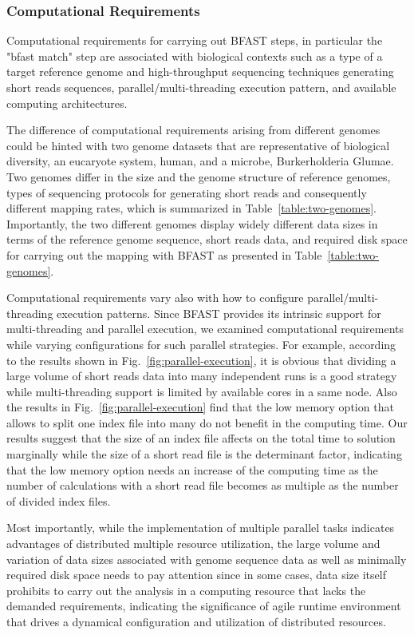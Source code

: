 \documentclass[12pt]{article}
\begin{document}
\subsubsection{Computational Requirements}

Computational requirements for carrying out BFAST steps, in particular the "bfast match" step are associated with biological contexts such as a type of a target reference genome and high-throughput sequencing techniques generating short reads sequences, parallel/multi-threading execution pattern, and available computing architectures.  

The difference of computational requirements arising from different genomes could be hinted with two genome datasets that are representative of biological diversity, an eucaryote system, human, and a microbe, Burkerholderia Glumae\cite{kim2011}.  Two genomes differ in the size and the genome structure of reference genomes, types of sequencing protocols for generating short reads and consequently different mapping rates, which is summarized in Table~\ref{table:two-genomes}.  Importantly, the two different genomes display widely different data sizes in terms of the reference genome sequence, short reads data, and required disk space for carrying out the mapping with BFAST as presented in Table~\ref{table:two-genomes}. 

Computational requirements vary also with how to configure parallel/multi-threading execution patterns.  Since BFAST provides its intrinsic support for multi-threading and parallel execution, we examined computational requirements while varying configurations for such parallel strategies.  For example, according to the results shown in Fig.~\ref{fig:parallel-execution}, it is obvious that dividing a large volume of short reads data into many independent runs is a good strategy while multi-threading support is limited by available cores in a same node.  Also the results in Fig.~\ref{fig:parallel-execution} find that the low memory option that allows to split one index file into many do not benefit in the computing time. Our results suggest that the size of an index file affects on the total time to solution marginally while the size of a short read file is the determinant factor, indicating that the low memory option needs an increase of the computing time as the number of calculations with a short read file becomes as multiple as the number of divided index files.   

Most importantly, while the implementation of multiple parallel tasks indicates advantages of distributed multiple resource utilization, the large volume and variation of data sizes associated with genome sequence data as well as minimally required disk space needs to pay attention since in some cases, data size itself prohibits to carry out the analysis in a computing resource that lacks the demanded requirements, indicating the significance of agile runtime environment that drives a dynamical configuration and utilization of distributed resources. 
\end{document}
